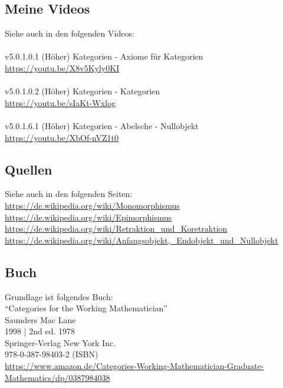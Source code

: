 \documentclass[a4paper]{amsart}
\theoremstyle{definition}
\begin{document}
\subsection*{Meine Videos}
Siehe auch in den folgenden Videos:\\ 
\\
v5.0.1.0.1 (Höher) Kategorien - Axiome für Kategorien\\
\url{https://youtu.be/X8v5Kyly0KI}\\
\\
v5.0.1.0.2 (Höher) Kategorien - Kategorien\\
\url{https://youtu.be/sIaKt-Wxlog}\\
\\
v5.0.1.6.1 (Höher) Kategorien - Abelsche - Nullobjekt\\
\url{https://youtu.be/XbOf-nVZ1t0}\\

\subsection*{Quellen}
Siehe auch in den folgenden Seiten:\\
\url{https://de.wikipedia.org/wiki/Monomorphismus}\\
\url{https://de.wikipedia.org/wiki/Epimorphismus}\\
\url{https://de.wikipedia.org/wiki/Retraktion_und_Koretraktion}\\
\url{https://de.wikipedia.org/wiki/Anfangsobjekt,_Endobjekt_und_Nullobjekt}\\

\subsection*{Buch}
Grundlage ist folgendes Buch:\\
"`Categories for the Working Mathematician"'\\
Saunders Mac Lane\\
1998 | 2nd ed. 1978\\
Springer-Verlag New York Inc.\\
978-0-387-98403-2 (ISBN)\\
{\tiny
   \url{https://www.amazon.de/Categories-Working-Mathematician-Graduate-Mathematics/dp/0387984038}}\\
\end{document}
